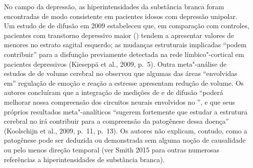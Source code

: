No campo da depressão, as hiperintensidades da substância branca foram
encontradas de modo consistente em pacientes idosos com depressão
unipolar. Um estudo de  de difusão em 2009 estabeleceu que, em
comparação com controles, pacientes com transtorno depressivo maior
() tendem a apresentar valores de  menores no estrato sagital
esquerdo; as mudanças estruturais implicadas ``podem contribuir'' para a
disfunção previamente detectada na rede límbico"-cortical em pacientes
depressivos (Kieseppä et al., 2009, p.~5). Outra meta"-análise de estudos
de  de volume cerebral no  observou que algumas das áreas
``envolvidas em'' regulação de emoção e reação a estresse apresentam
redução de volume. Os autores concluíram que a integração de medições de
 e  de difusão ``poderá melhorar nossa compreensão dos circuitos
neurais envolvidos no '', e que seus próprios resultados
meta"-analíticos ``sugerem fortemente que estudar a estrutura cerebral no
 irá contribuir para a compreensão da patogênese dessa doença''
(Koolschijn et al., 2009, p.~11, p.~13). Os autores não explicam, contudo,
como a patogênese pode ser deduzida ou demonstrada sem alguma noção de
causalidade ou pelo menos direção temporal (ver Smith 2015 para outras
numerosas referências a hiperintensidades de substância branca).


